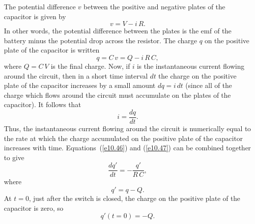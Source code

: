 The potential difference $v$ between the positive and negative plates
of the capacitor is given by
\begin{equation}
v = V - i\,R.
\end{equation}
In other words, the potential difference between the plates is the emf
of the battery minus the potential drop across the resistor. The charge
$q$ on the positive plate of the capacitor is written
\begin{equation}\label{e10.46}
q = C\, v = Q -i\,R\,C,
\end{equation}
where $Q=C\,V$ is the final charge. Now, if $i$ is the instantaneous current
flowing around the circuit, then in a short time interval $dt$ the
charge on the positive plate of the capacitor increases by a
small amount $d q = i\,dt$ (since all of the charge 
which flows around the circuit must accumulate on the plates of the
capacitor). It follows that
\begin{equation}\label{e10.47}
i = \frac{d q}{d t}.
\end{equation}
Thus, the instantaneous current flowing around the circuit is
numerically equal to the rate at which the charge accumulated
on the positive plate of
the capacitor increases with time. Equations~(\ref{e10.46}) and
(\ref{e10.47}) can be combined together to give
\begin{equation}\label{e10.48}
\frac{d q'}{dt} = - \frac{q'}{R\,C},
\end{equation}
where 
\begin{equation}\label{e10.49}
q' = q -Q.
\end{equation}
At $t=0$, just after the switch is closed, the charge on the positive
plate of the capacitor is zero, so
\begin{equation}\label{e10.50}
q'(t=0) = -Q.
\end{equation}

